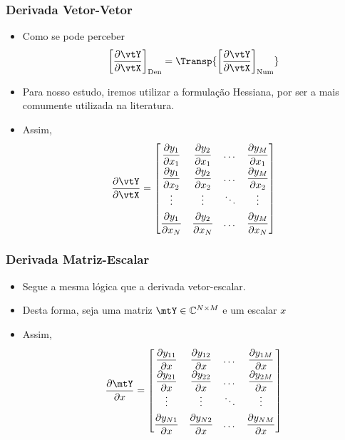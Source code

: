 \begin{frame}
	\frametitle{\normalsize Derivada Vetor-Vetor}
	\begin{itemize}
		\item Como se pode perceber
		\[
			\left[ \dfrac{\partial \vtY}{\partial \vtX} \right]_{\textrm{Den}} = \Transp{\left[ \dfrac{\partial \vtY}{\partial \vtX} \right]_{\textrm{Num}}}
		\]
		\item Para nosso estudo, iremos utilizar a formulação Hessiana, por ser a mais comumente utilizada na literatura.
		\item Assim,
		\[\renewcommand{\arraystretch}{1.8}
			\dfrac{\partial \vtY}{\partial \vtX} = \begin{bmatrix}
				\dfrac{\partial y_1}{\partial x_1} & \dfrac{\partial y_2}{\partial x_1} & \dots & \dfrac{\partial y_M}{\partial x_1} \\
				\dfrac{\partial y_1}{\partial x_2} & \dfrac{\partial y_2}{\partial x_2} & \dots & \dfrac{\partial y_M}{\partial x_2} \\
				\vdots & \vdots & \ddots & \vdots \\
				\dfrac{\partial y_1}{\partial x_N} & \dfrac{\partial y_2}{\partial x_N} & \dots & \dfrac{\partial y_M}{\partial x_N} \\
			\end{bmatrix}
		\]
	\end{itemize}
\end{frame}

\begin{frame}
	\frametitle{\normalsize Derivada Matriz-Escalar}
	\begin{itemize}
		\item Segue a mesma lógica que a derivada vetor-escalar.
		\item Desta forma, seja uma matriz $\mtY \in \mathbb{C}^{N \times M}$ e um escalar $x$
		\item Assim,
		\[\renewcommand{\arraystretch}{1.8}
			\dfrac{\partial \mtY}{\partial x} = \begin{bmatrix}
				\dfrac{\partial y_{11}}{\partial x} & \dfrac{\partial y_{12}}{\partial x} & \dots & \dfrac{\partial y_{1M}}{\partial x} \\
				\dfrac{\partial y_{21}}{\partial x} & \dfrac{\partial y_{22}}{\partial x} & \dots & \dfrac{\partial y_{2M}}{\partial x} \\
				\vdots & \vdots & \ddots & \vdots \\
				\dfrac{\partial y_{N1}}{\partial x} & \dfrac{\partial y_{N2}}{\partial x} & \dots & \dfrac{\partial y_{NM}}{\partial x} \\
			\end{bmatrix}
		\]
	\end{itemize}
\end{frame}

